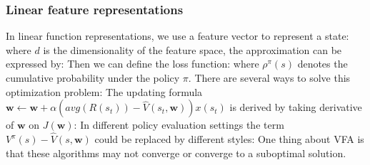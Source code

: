 \documentclass[10pt]{report}
\begin{document}
\subsubsection{Linear feature representations}
In linear function representations, we use a feature vector to represent a state:
where $d$ is the dimensionality of the feature space, the approximation can be expressed by:
Then we can define the loss function:
where $\rho^\pi(s)$ denotes the cumulative probability under the policy $\pi$. There are several ways to solve this optimization problem:
The updating formula $\mathbf{w}\leftarrow\mathbf{w}+\alpha(avg (R(s_t))-\hat{V}(s_t,\mathbf{w}))x(s_t)$ is derived by taking derivative
of $\mathbf{w}$ on $J(\mathbf{w})$:
In different policy evaluation settings the term $V^{\pi}(s)-\hat{V}(s,\mathbf{w})$ could be replaced by different styles:
One thing about VFA is that these algorithms may not converge or converge to a suboptimal solution.
\end{document}
